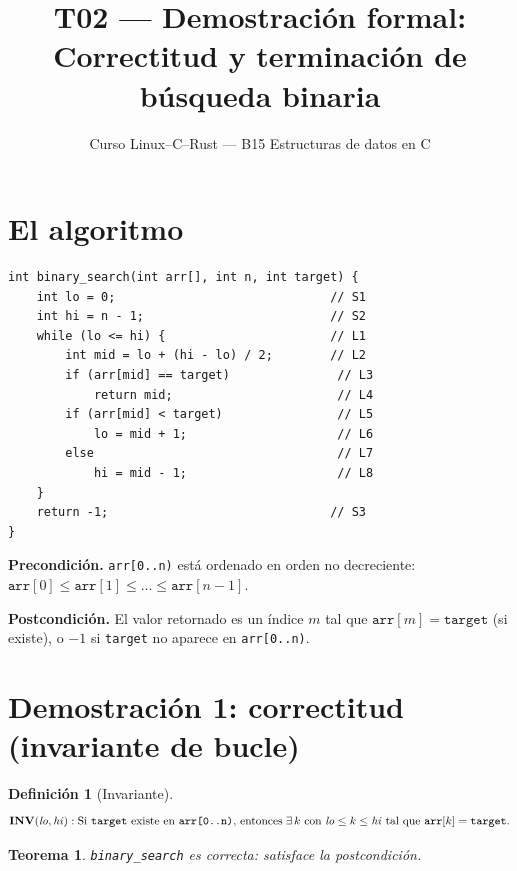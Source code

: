 \documentclass[11pt, letterpaper]{article}
\title{%
  T02 --- Demostración formal:\\[4pt]
  Correctitud y terminación de búsqueda binaria
}
\author{Curso Linux--C--Rust --- B15 Estructuras de datos en C}
\date{}
\theoremstyle{definition}
\newtheorem{definition}{Definición}[section]
\theoremstyle{plain}
\newtheorem{theorem}{Teorema}[section]
\theoremstyle{remark}
\begin{document}
\maketitle
\tableofcontents

\section{El algoritmo}

\begin{lstlisting}
int binary_search(int arr[], int n, int target) {
    int lo = 0;                              // S1
    int hi = n - 1;                          // S2
    while (lo <= hi) {                       // L1
        int mid = lo + (hi - lo) / 2;        // L2
        if (arr[mid] == target)               // L3
            return mid;                       // L4
        if (arr[mid] < target)                // L5
            lo = mid + 1;                     // L6
        else                                  // L7
            hi = mid - 1;                     // L8
    }
    return -1;                               // S3
}
\end{lstlisting}

\textbf{Precondición.} \texttt{arr[0..n)} está ordenado en orden no
decreciente:
$\texttt{arr}[0] \leq \texttt{arr}[1] \leq \ldots \leq \texttt{arr}[n{-}1]$.

\textbf{Postcondición.} El valor retornado es un índice $m$ tal que
$\texttt{arr}[m] = \texttt{target}$ (si existe), o $-1$ si
\texttt{target} no aparece en \texttt{arr[0..n)}.

\section{Demostración 1: correctitud (invariante de bucle)}

\begin{definition}[Invariante]
\[
  \textbf{INV}(\mathit{lo}, \mathit{hi}):
  \text{Si \texttt{target} existe en \texttt{arr[0..n)}, entonces}
  \;\exists\, k \text{ con } \mathit{lo} \leq k \leq \mathit{hi}
  \text{ tal que } \texttt{arr}[k] = \texttt{target}.
\]
\end{definition}

\begin{theorem}\label{thm:correctness}
\texttt{binary\_search} es correcta: satisface la postcondición.
\end{theorem}
\end{document}
